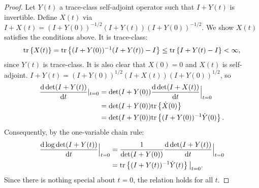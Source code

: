 \documentclass{amsart}
\numberwithin{equation}{section}
\begin{document}
\begin{proof}
  Let $Y(t)$ a trace-class self-adjoint operator such that 
  $I+Y(t)$ is invertible.
  Define $X(t)$ via $I+X(t) = (I+Y(0))^{-1/2} (I+Y(t)) (I+Y(0))^{-1/2}$. 
  We show $X(t)$ satisfies the conditions above. It is trace-class:
  \begin{align*}
    \textup{tr}\left \{X(t) \right \} = \textup{tr}\left \{(I+Y(0))^{-1} (I+Y(t)) - I \right \}
    \leq \textup{tr}\left \{I+Y(t) - I \right \}< \infty,
  \end{align*}
  since $Y(t)$ is trace-class. It is also clear that
  $X(0) = 0$ and $X(t)$ is self-adjoint.
  $I+Y(t) = (I+Y(0))^{1/2}(I+X(t))(I+Y(0))^{1/2}$, so
  \begin{align*}
    \frac{\text{\textup{d}} \det (I+Y(t))}{\text{\textup{d}} t}|_{t=0} 
    &= \det (I+Y(0))\frac{\text{\textup{d}} \det (I+X(t))}{\text{\textup{d}} t}\Big |_{t=0} \\
    &= \det (I+Y(0)) \textup{tr}\left \{\dot{X}(0) \right \} \\
    &= \det (I+Y(0)) \textup{tr}\left \{(I+Y(0))^{-1} \dot{Y}(0) \right \}.
  \end{align*}
  Consequently, by the one-variable chain rule:
  \begin{align*}
    \frac{\text{\textup{d}} \log \det (I+Y(t))}{\text{\textup{d}} t}\Big |_{t=0} &=
    \frac{1}{\det (I+Y(0))}\frac{\text{\textup{d}} \det (I+Y(t))}{\text{\textup{d}} t}\Big |_{t=0} \\ 
    &= \textup{tr}\left \{ (I+Y(t))^{-1} \dot{Y}(t) \right \} \big |_{t=0}.
  \end{align*}
  Since there is nothing special about $t=0$, the relation holds for all $t$.
\end{proof}
\end{document}
